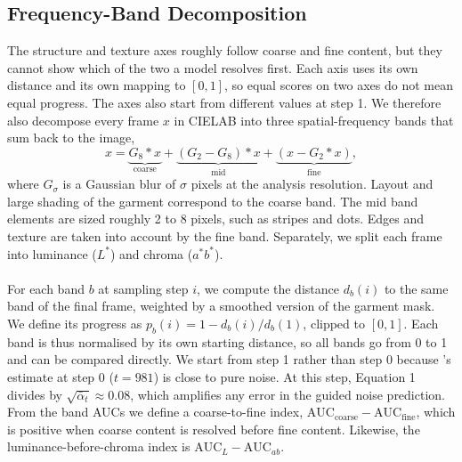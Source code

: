 \subsection{Frequency-Band Decomposition}
\label{sec:bands}
The structure and texture axes roughly follow coarse and fine content, but they cannot show which of the two a model resolves first. Each axis uses its own distance and its own mapping to $[0,1]$, so equal scores on two axes do not mean equal progress. The axes also start from different values at step 1. We therefore also decompose every frame $x$ in CIELAB into three spatial-frequency bands that sum back to the image,
\begin{equation}
x = \underbrace{G_8 * x}_{\text{coarse}} + \underbrace{(G_2 - G_8) * x}_{\text{mid}} + \underbrace{(x - G_2 * x)}_{\text{fine}},
\end{equation}
where $G_\sigma$ is a Gaussian blur of $\sigma$ pixels at the analysis resolution. Layout and large shading of the garment correspond to the coarse band. The mid band elements are sized roughly 2 to 8 pixels, such as stripes and dots. Edges and texture are taken into account by the fine band. Separately, we split each frame into luminance ($L^*$) and chroma ($a^*b^*$).
\\ \\
For each band $b$ at sampling step $i$, we compute the distance $d_b(i)$ to the same band of the final frame, weighted by a smoothed version of the garment mask. We define its progress as $p_b(i) = 1 - d_b(i)/d_b(1)$, clipped to $[0, 1]$. Each band is thus normalised by its own starting distance, so all bands go from 0 to 1 and can be compared directly. We start from step 1 rather than step 0 because \idm's estimate at step 0 ($t = 981$) is close to pure noise. At this step, Equation 1 divides by $\sqrt{\bar{\alpha}_t} \approx 0.08$, which amplifies any error in the guided noise prediction. From the band AUCs we define a coarse-to-fine index, $\text{AUC}_\text{coarse} - \text{AUC}_\text{fine}$, which is positive when coarse content is resolved before fine content. Likewise, the luminance-before-chroma index is $\text{AUC}_{L} - \text{AUC}_{ab}$.
